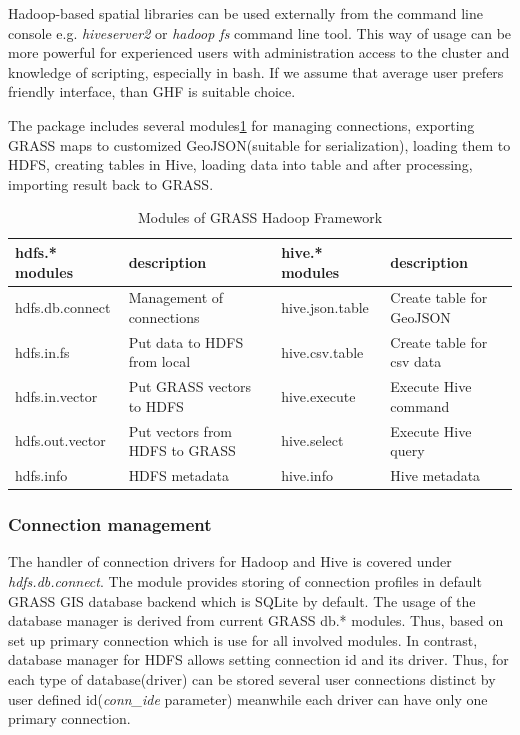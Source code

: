 \documentclass[a4paper,12pt,oneside]{report}
\begin{document}
    Hadoop-based spatial libraries can be used externally from the
    command line console e.g. \textit{hiveserver2} or \textit{hadoop fs}
    command line tool. This way of usage can be more powerful for experienced users with
    administration access to the cluster and knowledge of scripting, especially in bash.
    If we assume that average user prefers friendly interface, than GHF is suitable
    choice. 
    
    The package includes several modules\ref{tbl:modules} for managing connections,
    exporting GRASS maps to customized GeoJSON(suitable for serialization), loading
    them to HDFS, creating tables in Hive, loading data into table and after
    processing, importing result back to GRASS.

	
	\begin{table}[!htbp]
		\centering
		\begin{scriptsize}
			\begin{tabular}{@{}|l|l||l|l|@{}}
				\toprule
				hdfs.* modules  & description                    & hive.* modules  & description
				\\ \midrule \midrule
				hdfs.db.connect & Management of connections      & hive.json.table & Create
				table for GeoJSON  \\ \midrule
				hdfs.in.fs      & Put data to HDFS from local       & hive.csv.table  & Create
				table for csv data \\ \midrule
				hdfs.in.vector  & Put GRASS vectors to HDFS      & hive.execute    & Execute
				Hive command      \\ \midrule
				hdfs.out.vector & Put vectors from HDFS to GRASS & hive.select     & Execute
				Hive query        \\ \midrule
				hdfs.info       & HDFS metadata                  & hive.info       & Hive
				metadata             \\ \bottomrule
			\end{tabular}%
		\end{scriptsize}
		\caption{Modules of GRASS Hadoop Framework}
		\label{tbl:modules}
	\end{table}
	
	
	
    \subsubsection{Connection management} 
    The handler of connection drivers for Hadoop and Hive is covered under
    \textit{hdfs.db.connect}. The module provides storing of connection profiles in
    default GRASS GIS database backend which is SQLite  by default. The usage of 
    the database manager is derived from current GRASS db.* modules.
    Thus, based on set up primary connection which is use for all involved modules.
    In contrast, database manager for HDFS allows setting
    connection id and its driver. Thus, for each type of database(driver) can be
    stored several user connections distinct by user defined id(\textit{conn\_ide}
    parameter) meanwhile  each driver can have only one primary connection.
	
\end{document}
